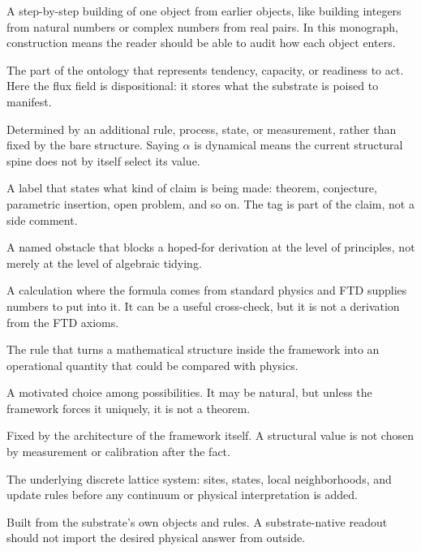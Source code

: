 \begin{termnotes}
  \item[Construction.]
  A step-by-step building of one object from earlier objects, like building
  integers from natural numbers or complex numbers from real pairs. In this
  monograph, construction means the reader should be able to audit how each
  object enters.

  \item[Dispositional.]
  The part of the ontology that represents tendency, capacity, or readiness to
  act. Here the flux field is dispositional: it stores what the substrate is
  poised to manifest.

  \item[Dynamical.]
  Determined by an additional rule, process, state, or measurement, rather than
  fixed by the bare structure. Saying $\alpha$ is dynamical means the current
  structural spine does not by itself select its value.

  \item[Epistemic tag.]
  A label that states what kind of claim is being made: theorem, conjecture,
  parametric insertion, open problem, and so on. The tag is part of the claim,
  not a side comment.

  \item[Foundational obstruction.]
  A named obstacle that blocks a hoped-for derivation at the level of principles,
  not merely at the level of algebraic tidying.

  \item[Parametric insertion.]
  A calculation where the formula comes from standard physics and FTD supplies
  numbers to put into it. It can be a useful cross-check, but it is not a
  derivation from the FTD axioms.

  \item[Readout.]
  The rule that turns a mathematical structure inside the framework into an
  operational quantity that could be compared with physics.

  \item[Selection.]
  A motivated choice among possibilities. It may be natural, but unless the
  framework forces it uniquely, it is not a theorem.

  \item[Structural.]
  Fixed by the architecture of the framework itself. A structural value is not
  chosen by measurement or calibration after the fact.

  \item[Substrate.]
  The underlying discrete lattice system: sites, states, local neighborhoods,
  and update rules before any continuum or physical interpretation is added.

  \item[Substrate-native.]
  Built from the substrate's own objects and rules. A substrate-native readout
  should not import the desired physical answer from outside.
\end{termnotes}

